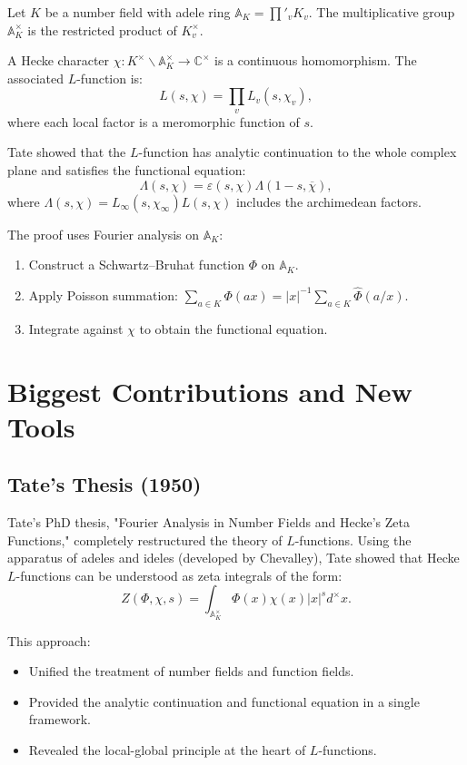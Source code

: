 Let $K$ be a number field with adele ring $\mathbb{A}_K = \prod'_v K_v$. The multiplicative group $\mathbb{A}_K^\times$ is the restricted product of $K_v^\times$.

A Hecke character $\chi: K^\times \backslash \mathbb{A}_K^\times \to \mathbb{C}^\times$ is a continuous homomorphism. The associated $L$-function is:
\[
L(s,\chi) = \prod_v L_v(s, \chi_v),
\]
where each local factor is a meromorphic function of $s$.

Tate showed that the $L$-function has analytic continuation to the whole complex plane and satisfies the functional equation:
\[
\Lambda(s,\chi) = \varepsilon(s,\chi) \Lambda(1-s, \overline{\chi}),
\]
where $\Lambda(s,\chi) = L_\infty(s,\chi_\infty) L(s,\chi)$ includes the archimedean factors.

The proof uses Fourier analysis on $\mathbb{A}_K$:
\begin{enumerate}
\item Construct a Schwartz--Bruhat function $\Phi$ on $\mathbb{A}_K$.
\item Apply Poisson summation: $\sum_{a \in K} \Phi(ax) = |x|^{-1} \sum_{a \in K} \widehat{\Phi}(a/x)$.
\item Integrate against $\chi$ to obtain the functional equation.
\end{enumerate}

\section{Biggest Contributions and New Tools}

\subsection{Tate's Thesis (1950)}

Tate's PhD thesis, "Fourier Analysis in Number Fields and Hecke's Zeta Functions," completely restructured the theory of $L$-functions. Using the apparatus of adeles and ideles (developed by Chevalley), Tate showed that Hecke $L$-functions can be understood as zeta integrals of the form:
\[
Z(\Phi, \chi, s) = \int_{\mathbb{A}_K^\times} \Phi(x) \chi(x) |x|^s d^\times x.
\]

This approach:
\begin{itemize}
\item Unified the treatment of number fields and function fields.
\item Provided the analytic continuation and functional equation in a single framework.
\item Revealed the local-global principle at the heart of $L$-functions.
\end{itemize}

